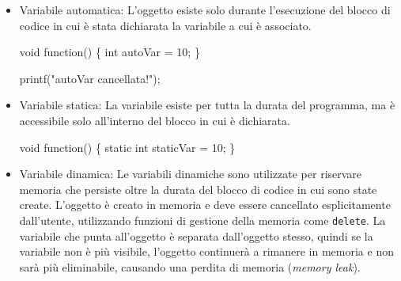 \documentclass[
  letterpaper,
]{scrbook}
\newenvironment{Shaded}{\begin{snugshade}}{\end{snugshade}}
\newcommand{\DataTypeTok}[1]{\textcolor[rgb]{0.68,0.00,0.00}{#1}}
\newcommand{\DecValTok}[1]{\textcolor[rgb]{0.68,0.00,0.00}{#1}}
\newcommand{\NormalTok}[1]{\textcolor[rgb]{0.00,0.23,0.31}{#1}}
\newcommand{\OperatorTok}[1]{\textcolor[rgb]{0.37,0.37,0.37}{#1}}
\newcommand{\StringTok}[1]{\textcolor[rgb]{0.13,0.47,0.30}{#1}}
\providecommand{\tightlist}{%
  \setlength{\itemsep}{0pt}\setlength{\parskip}{0pt}}\usepackage{longtable,booktabs,array}
\newcommand*\circled[1]{\tikz[baseline=(char.base)]{
          \node[shape=circle,draw,inner sep=1pt] (char) {{\scriptsize#1}};}}
\begin{document}
\begin{itemize}
\item
  Variabile automatica: L'oggetto esiste solo durante l'esecuzione del
  blocco di codice in cui è stata dichiarata la variabile a cui è
  associato.

\label{annotated-cell-117}%
\begin{Shaded}
\begin{Highlighting}[]
\DataTypeTok{void}\NormalTok{ function}\OperatorTok{()} \OperatorTok{\{}
  \DataTypeTok{int}\NormalTok{ autoVar }\OperatorTok{=} \DecValTok{10}\OperatorTok{;} \hspace*{\fill}\NormalTok{\circled{1}}
\OperatorTok{\}} 

\NormalTok{printf}\OperatorTok{(}\StringTok{"autoVar cancellata!"}\OperatorTok{);} \hspace*{\fill}\NormalTok{\circled{2}}
\end{Highlighting}
\end{Shaded}

\item
  Variabile statica: La variabile esiste per tutta la durata del
  programma, ma è accessibile solo all'interno del blocco in cui è
  dichiarata.

\label{annotated-cell-118}%
\begin{Shaded}
\begin{Highlighting}[]
\DataTypeTok{void}\NormalTok{ function}\OperatorTok{()} \OperatorTok{\{}
  \DataTypeTok{static} \DataTypeTok{int}\NormalTok{ staticVar }\OperatorTok{=} \DecValTok{10}\OperatorTok{;} \hspace*{\fill}\NormalTok{\circled{1}}
\OperatorTok{\}}
\end{Highlighting}
\end{Shaded}

\item
  Variabile dinamica: Le variabili dinamiche sono utilizzate per
  riservare memoria che persiste oltre la durata del blocco di codice in
  cui sono state create. L'oggetto è creato in memoria e deve essere
  cancellato esplicitamente dall'utente, utilizzando funzioni di
  gestione della memoria come \texttt{delete}. La variabile che punta
  all'oggetto è separata dall'oggetto stesso, quindi se la variabile non
  è più visibile, l'oggetto continuerà a rimanere in memoria e non sarà
  più eliminabile, causando una perdita di memoria (\emph{memory leak}).


\end{itemize}
\end{document}
